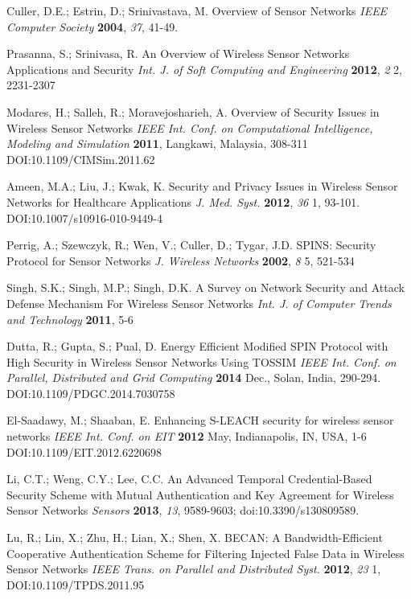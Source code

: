 \documentclass{ws-fnl2}
\begin{document}
\begin{thebibliography}{99}

Culler, D.E.; Estrin, D.; Srinivastava, M. Overview of Sensor Networks {\em IEEE Computer Society} {\bf 2004}, {\em 37}, 41-49.

Prasanna, S.; Srinivasa, R. An Overview of Wireless Sensor Networks Applications and Security {\em Int. J. of Soft Computing and Engineering} {\bf 2012}, {\em 2} 2, 2231-2307

Modares, H.; Salleh, R.; Moravejosharieh, A. Overview of Security Issues in Wireless Sensor Networks {\em IEEE Int. Conf. on Computational Intelligence, Modeling and Simulation} {\bf 2011}, Langkawi, Malaysia, 308-311 DOI:10.1109/CIMSim.2011.62 

Ameen, M.A.; Liu, J.; Kwak, K. Security and Privacy Issues in Wireless Sensor Networks for Healthcare Applications {\em J. Med. Syst.} {\bf 2012}, {\em 36} 1, 93-101. DOI:10.1007/s10916-010-9449-4





Perrig, A.; Szewczyk, R.; Wen, V.; Culler, D.; Tygar, J.D. SPINS: Security Protocol for Sensor Networks {\em J. Wireless Networks} {\bf 2002}, {\em 8} 5, 521-534

Singh, S.K.; Singh, M.P.; Singh, D.K. A Survey on Network Security and Attack Defense Mechanism For Wireless Sensor Networks {\em Int. J. of Computer Trends and Technology} {\bf 2011}, 5-6

Dutta, R.; Gupta, S.; Pual, D. Energy Efficient Modified SPIN Protocol with High Security in Wireless Sensor Networks Using TOSSIM {\em IEEE Int. Conf. on Parallel, Distributed and Grid Computing} {\bf 2014} Dec., Solan, India, 290-294. DOI:10.1109/PDGC.2014.7030758 

El-Saadawy, M.; Shaaban, E. Enhancing S-LEACH security for wireless sensor networks {\em IEEE Int. Conf. on EIT} {\bf 2012} May, Indianapolis, IN, USA, 1-6 DOI:10.1109/EIT.2012.6220698 

Li, C.T.; Weng, C.Y.; Lee, C.C. An Advanced Temporal Credential-Based Security Scheme with Mutual Authentication and Key Agreement for Wireless Sensor Networks {\em Sensors} {\bf 2013}, {\em 13}, 9589-9603; doi:10.3390/s130809589.

Lu, R.; Lin, X.; Zhu, H.; Lian, X.; Shen, X. BECAN: A Bandwidth-Efficient Cooperative Authentication Scheme for Filtering Injected False Data in Wireless Sensor Networks {\em IEEE Trans. on Parallel and Distributed Syst.} {\bf 2012}, {\em 23} 1, DOI:10.1109/TPDS.2011.95


\end{thebibliography}
\end{document}

